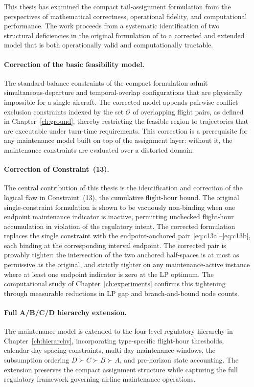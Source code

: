 This thesis has examined the compact tail-assignment formulation from the perspectives of mathematical correctness, operational fidelity, and computational performance. The work proceeds from a systematic identification of two structural deficiencies in the original formulation of \citet{khaled2018compact} to a corrected and extended model that is both operationally valid and computationally tractable.

\paragraph{Correction of the basic feasibility model.}
The standard balance constraints of the compact formulation admit simultaneous-departure and temporal-overlap configurations that are physically impossible for a single aircraft. The corrected model appends pairwise conflict-exclusion constraints indexed by the set $\mathcal{O}$ of overlapping flight pairs, as defined in Chapter~\ref{ch:ground}, thereby restricting the feasible region to trajectories that are executable under turn-time requirements. This correction is a prerequisite for any maintenance model built on top of the assignment layer: without it, the maintenance constraints are evaluated over a distorted domain.

\paragraph{Correction of Constraint~(13).}
The central contribution of this thesis is the identification and correction of the logical flaw in Constraint~(13), the cumulative flight-hour bound. The original single-constraint formulation is shown to be vacuously non-binding when one endpoint maintenance indicator is inactive, permitting unchecked flight-hour accumulation in violation of the regulatory intent. The corrected formulation replaces the single constraint with the endpoint-anchored pair~\eqref{eq:c13a}--\eqref{eq:c13b}, each binding at the corresponding interval endpoint. The corrected pair is provably tighter: the intersection of the two anchored half-spaces is at most as permissive as the original, and strictly tighter on any maintenance-active instance where at least one endpoint indicator is zero at the LP optimum. The computational study of Chapter~\ref{ch:experiments} confirms this tightening through measurable reductions in LP gap and branch-and-bound node counts.

\paragraph{Full A/B/C/D hierarchy extension.}
The maintenance model is extended to the four-level regulatory hierarchy in Chapter~\ref{ch:hierarchy}, incorporating type-specific flight-hour thresholds, calendar-day spacing constraints, multi-day maintenance windows, the subsumption ordering $D \succ C \succ B \succ A$, and pre-horizon state accounting. The extension preserves the compact assignment structure while capturing the full regulatory framework governing airline maintenance operations.

